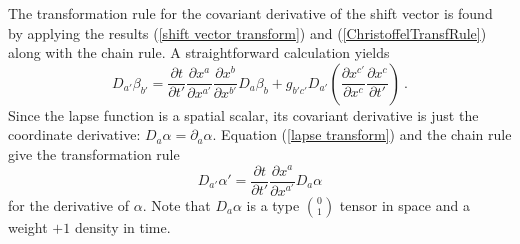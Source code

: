 \documentclass[letterpaper,nofootinbib,prd,amsmath,onecolumn]{revtex4-1}
\begin{document}
The transformation rule for the covariant derivative of the shift vector is found by applying the results (\ref{shift vector transform}) and 
(\ref{ChristoffelTransfRule}) along with the chain rule. A straightforward calculation yields
\begin{equation} \label{TransfRuleForShift}
D_{a'}\beta_{b'} =  \frac{\partial t}{\partial t'}\frac{\partial x^{a}}{\partial x^{a'}}\frac{\partial x^{b}}{\partial x^{b'}}  D_{a}\beta_{b}
+ g_{b'c'}D_{a'}\left(\frac{\partial x^{c'}}{\partial x^{c}}\frac{\partial x^{c}}{\partial t'}\right) \ .
\end{equation}
Since the lapse function is a spatial scalar, its covariant derivative is just the coordinate derivative: $D_a\alpha = \partial_a \alpha$. 
Equation (\ref{lapse transform}) and the chain rule give the transformation rule 
\begin{equation}\label{TransfRuleDalphaDa}
D_{a'}\alpha' = \frac{\partial t}{\partial t'}\frac{\partial x^{a}}{\partial x^{a'}} D_{a}\alpha 
\end{equation}
for the derivative of $\alpha$. 
Note that $D_a\alpha$ is a type $0 \choose 1$ tensor in space and a weight $+1$ density in time.
\end{document}
